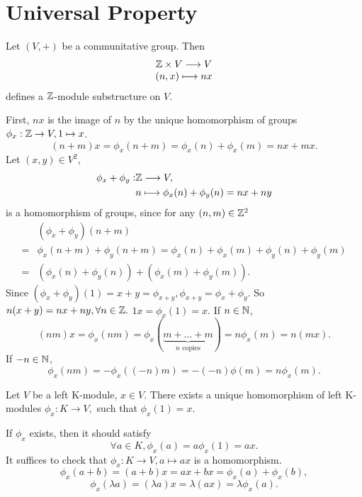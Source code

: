 \section{Universal Property}
\begin{propositionenv}
    Let $(V, +)$ be a communitative group. Then 
    $$\begin{matrix}
        \mathbb{Z}\times V\longrightarrow V\\
        (n, x)\longmapsto nx
    \end{matrix}$$
    defines a $\mathbb{Z}$-module substructure on $V$.
\end{propositionenv}
\begin{proofenv}
    First,  $nx$ is the image of $n$ by the unique homomorphism of groups $\phi_x:\mathbb{Z}\rightarrow V, 1\mapsto x$.
    $$(n+m)x=\phi_x(n+m)=\phi_x(n)+\phi_x(m)=nx+mx.$$
     Let $(x, y)\in V^2$, 
    \begin{align*}
        \phi_x+\phi_y:&\mathbb{Z} \longrightarrow V, \\
        &n\longmapsto \phi_x(n)+\phi_y(n)=nx+ny
    \end{align*}
    is a homomorphism of groups,  since for any $(n, m)\in \mathbb{Z}^2$
    \begin{align*}
        &(\phi_x+\phi_y)(n+m)\\
        =&\phi_x(n+m)+\phi_y(n+m)=\phi_x(n)+\phi_x(m)+\phi_y(n)+\phi_y(m)\\
        =&(\phi_x(n)+\phi_y(n))+(\phi_x(m)+\phi_y(m)).
    \end{align*}
    Since $(\phi_x+\phi_y)(1)=x+y=\phi_{x+y}, \phi_{x+y}=\phi_x+\phi_y.$ So $n(x+y)=nx+ny,  \forall n\in\mathbb{Z}.$ $1x=\phi_x(1)=x.$
    If $n\in \mathbb{N}$, 
    $$(nm)x=\phi_x(nm)=\phi_x(\underset{n \text{ copies}}{\underbrace{m+\dots+m}})=n\phi_x(m)=n(mx).$$
    If $-n\in \mathbb{N}$, 
    $$\phi_x(nm)=-\phi_x((-n)m)=-(-n)\phi(m)=n\phi_x(m).$$
\end{proofenv}
\begin{propositionenv}
    Let $V$ be a left K-module,  $x\in V$. There exists a unique homomorphism of left K-modules 
    $\phi_x:K\longrightarrow V, $
    such that $\phi_x(1)=x$.
\end{propositionenv}
\begin{proofenv}
    If $\phi_x$ exists,  then it should satisfy 
    $$\forall a\in K, \phi_x(a)=a\phi_x(1)=ax.$$
    It suffices to check that $\phi_x:K\rightarrow V, a\mapsto ax$ is a homomorphism.
    $$\phi_x(a+b)=(a+b)x=ax+bx=\phi_x(a)+\phi_x(b), $$
    $$\phi_x(\lambda a)=(\lambda a)x=\lambda(ax)=\lambda\phi_x(a).$$
\end{proofenv}
